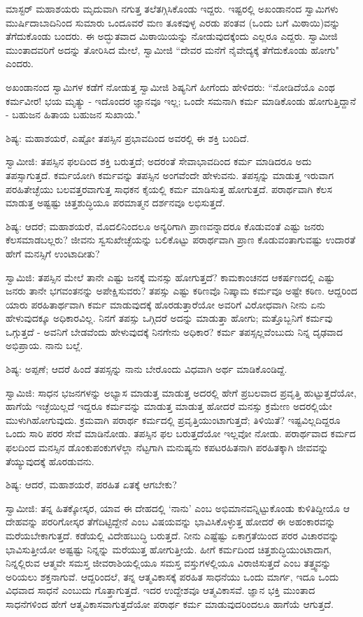 ಮಾಸ್ಟರ್ ಮಹಾಶಯರು ಮೃದುವಾಗಿ ನಗುತ್ತ ತಲೆತಗ್ಗಿಸಿಕೊಂಡು ಇದ್ದರು. ಇಷ್ಟರಲ್ಲಿ ಅಖಂಡಾನಂದ ಸ್ವಾಮಿಗಳು ಮುರ್ಷಿದಾಬಾದಿನಿಂದ ಸುಮಾರು ಒಂದೂವರೆ ಮಣ ತೂಕವುಳ್ಳ ಎರಡು ಪಂತವ (ಒಂದು ಬಗೆ ಮಿಠಾಯಿ)ವನ್ನು ತೆಗೆದುಕೊಂಡು ಬಂದರು. ಈ ಅದ್ಭುತವಾದ ಮಿಠಾಯಿಯನ್ನು ನೋಡುವುದಕ್ಕೆಂದು ಎಲ್ಲರೂ ಎದ್ದರು. ಸ್ವಾಮೀಜಿ ಮುಂತಾದವರಿಗೆ ಅದನ್ನು ತೋರಿಸಿದ ಮೇಲೆ, ಸ್ವಾಮೀಜಿ “ದೇವರ ಮನೆಗೆ ನೈವೇದ್ಯಕ್ಕೆ ತೆಗೆದುಕೊಂಡು ಹೋಗು" ಎಂದರು.

ಅಖಂಡಾನಂದ ಸ್ವಾಮಿಗಳ ಕಡೆಗೆ ನೋಡುತ್ತ ಸ್ವಾಮೀಜಿ ಶಿಷ್ಯನಿಗೆ ಹೀಗೆಂದು ಹೇಳಿದರು: “ನೋಡಿದೆಯೊ ಎಂಥ ಕರ್ಮವೀರ! ಭಯ ಮೃತ್ಯು - ಇದೊಂದರ ಜ್ಞಾನವೂ ಇಲ್ಲ; ಒಂದೇ ಸಮನಾಗಿ ಕರ್ಮ ಮಾಡಿಕೊಂಡು ಹೋಗುತ್ತಿದ್ದಾನೆ - ಬಹುಜನ ಹಿತಾಯ ಬಹುಜನ ಸುಖಾಯ."

ಶಿಷ್ಯ: ಮಹಾಶಯರೆ, ಎಷ್ಟೋ ತಪಸ್ಸಿನ ಪ್ರಭಾವದಿಂದ ಅವರಲ್ಲಿ ಈ ಶಕ್ತಿ ಬಂದಿದೆ.

ಸ್ವಾಮೀಜಿ: ತಪಸ್ಸಿನ ಫಲದಿಂದ ಶಕ್ತಿ ಬರುತ್ತದೆ; ಅದರಂತೆ ಸೇವಾಭಾವದಿಂದ ಕರ್ಮ ಮಾಡಿದರೂ ಅದು ತಪಸ್ಸಾಗುತ್ತದೆ. ಕರ್ಮಯೋಗಿ ಕರ್ಮವನ್ನು ತಪಸ್ಸಿನ ಅಂಗವೆಂದೇ ಹೇಳುವನು. ತಪಸ್ಸನ್ನು ಮಾಡುತ್ತ ಇರುವಾಗ ಪರಹಿತೇಚ್ಛೆಯು ಬಲವತ್ತರವಾಗುತ್ತ ಸಾಧಕನ ಕೈಯಲ್ಲಿ ಕರ್ಮ ಮಾಡಿಸುತ್ತ ಹೋಗುತ್ತದೆ. ಪರಾರ್ಥವಾಗಿ ಕೆಲಸ ಮಾಡುತ್ತ ಅಷ್ಟಷ್ಟು ಚಿತ್ತಶುದ್ಧಿಯೂ ಪರಮಾತ್ಮನ ದರ್ಶನವೂ ಲಭಿಸುತ್ತದೆ.

ಶಿಷ್ಯ: ಆದರೆ; ಮಹಾಶಯರೆ, ಮೊದಲಿನಿಂದಲೂ ಅನ್ಯರಿಗಾಗಿ ಪ್ರಾಣವನ್ನಾದರೂ ಕೊಡುವಂತೆ ಎಷ್ಟು ಜನರು ಕೆಲಸಮಾಡಬಲ್ಲರು? ಜೀವನು ಸ್ವಸುಖೇಚ್ಛೆಯನ್ನು ಬಲಿಕೊಟ್ಟು ಪರಾರ್ಥವಾಗಿ ಪ್ರಾಣ ಕೊಡುವಂತಾಗುವಷ್ಟು ಉದಾರತೆ ಹೇಗೆ ಮನಸ್ಸಿಗೆ ಉಂಟಾದೀತು?

ಸ್ವಾಮಿಜಿ: ತಪಸ್ಸಿನ ಮೇಲೆ ತಾನೇ ಎಷ್ಟು ಜನಕ್ಕೆ ಮನಸ್ಸು ಹೋಗುತ್ತದೆ? ಕಾಮಕಾಂಚನದ ಆಕರ್ಷಣದಲ್ಲಿ ಎಷ್ಟು ಜನರು ತಾನೇ ಭಗವಂತನನ್ನು ಅಪೇಕ್ಷಿಸುವರು? ತಪಸ್ಸು ಎಷ್ಟು ಕಠಿಣವೊ ನಿಷ್ಕಾಮ ಕರ್ಮವೂ ಅಷ್ಟೇ ಕಠಿಣ. ಆದ್ದರಿಂದ ಯಾರು ಪರಹಿತಾರ್ಥವಾಗಿ ಕರ್ಮ ಮಾಡುವುದಕ್ಕೆ ಹೊರಡುತ್ತಾರೆಯೋ ಅವರಿಗೆ ವಿರೋಧವಾಗಿ ನೀನು ಏನು ಹೇಳುವುದಕ್ಕೂ ಅಧಿಕಾರವಿಲ್ಲ. ನಿನಗೆ ತಪಸ್ಸು ಒಗ್ಗಿದರೆ ಅದನ್ನು ಮಾಡುತ್ತಾ ಹೋಗು; ಮತ್ತೊಬ್ಬನಿಗೆ ಕರ್ಮವು ಒಗ್ಗುತ್ತದೆ - ಅವನಿಗೆ ಬೇಡವೆಂದು ಹೇಳುವುದಕ್ಕೆ ನಿನಗೇನು ಅಧಿಕಾರ? ಕರ್ಮ ತಪಸ್ಸಲ್ಲವೆಂಬುದು ನಿನ್ನ ದೃಢವಾದ ಅಭಿಪ್ರಾಯ. ನಾನು ಬಲ್ಲೆ.

ಶಿಷ್ಯ: ಅಪ್ಪಣೆ; ಆದರೆ ಹಿಂದೆ ತಪಸ್ಸನ್ನು ನಾನು ಬೇರೊಂದು ವಿಧವಾಗಿ ಅರ್ಥ ಮಾಡಿಕೊಂಡಿದ್ದೆ.

ಸ್ವಾಮಿಜಿ: ಸಾಧನ ಭಜನಗಳನ್ನು ಅಭ್ಯಾಸ ಮಾಡುತ್ತ ಮಾಡುತ್ತ ಅದರಲ್ಲಿ ಹೇಗೆ ಪ್ರಬಲವಾದ ಪ್ರವೃತ್ತಿ ಹುಟ್ಟುತ್ತದೆಯೋ, ಹಾಗೆಯೆ ಇಚ್ಛೆಯಿಲ್ಲದೆ ಇದ್ದರೂ ಕರ್ಮವನ್ನು ಮಾಡುತ್ತ ಮಾಡುತ್ತ ಹೋದರೆ ಮನಸ್ಸು ಕ್ರಮೇಣ ಅದರಲ್ಲಿಯೇ ಮುಳುಗಿಹೋಗುವುದು. ಕ್ರಮವಾಗಿ ಪರಾರ್ಥ ಕರ್ಮದಲ್ಲಿ ಪ್ರವೃತ್ತಿಯುಂಟಾಗುತ್ತದೆ; ತಿಳಿಯಿತೆ? ಇಷ್ಟವಿಲ್ಲದಿದ್ದರೂ ಒಂದು ಸಾರಿ ಪರರ ಸೇವೆ ಮಾಡಿನೋಡು. ತಪಸ್ಸಿನ ಫಲ ಬರುತ್ತದೆಯೋ ಇಲ್ಲವೋ ನೋಡು. ಪರಾರ್ಥವಾದ ಕರ್ಮದ ಫಲದಿಂದ ಮನಸ್ಸಿನ ಡೊಂಕುಪಂಕುಗಳೆಲ್ಲಾ ನೆಟ್ಟಗಾಗಿ ಮನುಷ್ಯನು ಕಪಟರಹಿತನಾಗಿ ಪರಹಿತಕ್ಕಾಗಿ ಜೀವವನ್ನು ತೆಯ್ಯುವುದಕ್ಕೆ ಹೊರಡುವನು.

ಶಿಷ್ಯ: ಆದರೆ, ಮಹಾಶಯರೆ, ಪರಹಿತ ಏತಕ್ಕೆ ಆಗಬೇಕು?

ಸ್ವಾಮೀಜಿ: ತನ್ನ ಹಿತಕ್ಕೋಸ್ಕರ, ಯಾವ ಈ ದೇಹದಲ್ಲಿ ‘ನಾನು’ ಎಂಬ ಅಭಿಮಾನವನ್ನಿಟ್ಟುಕೊಂಡು ಕುಳಿತಿದ್ದೀಯೊ ಆ ದೇಹವನ್ನು ಪರರಿಗೋಸ್ಕರ ತೆಗೆದಿಟ್ಟಿದ್ದೇನೆ ಎಂಬ ವಿಷಯವನ್ನು ಭಾವಿಸಿಕೊಳ್ಳುತ್ತ ಹೋದರೆ ಈ ಅಹಂಕಾರವನ್ನು ಮರೆಯಬೇಕಾಗುತ್ತದೆ. ಕಡೆಯಲ್ಲಿ ವಿದೇಹಬುದ್ಧಿ ಬರುತ್ತದೆ. ನೀನು ಎಷ್ಟೆಷ್ಟು ಏಕಾಗ್ರತೆಯಿಂದ ಪರರ ವಿಚಾರವನ್ನು ಭಾವಿಸುತ್ತೀಯೋ ಅಷ್ಟಷ್ಟು ನಿನ್ನನ್ನು ಮರೆಯುತ್ತ ಹೋಗುತ್ತೀಯೆ. ಹೀಗೆ ಕರ್ಮದಿಂದ ಚಿತ್ತಶುದ್ಧಿಯುಂಟಾದಾಗ, ನಿನ್ನಲ್ಲಿರುವ ಆತ್ಮವೇ ಸಮಸ್ತ ಜೀವರಾಶಿಯಲ್ಲಿಯೂ ಸಮಸ್ತ ವಸ್ತುಗಳಲ್ಲಿಯೂ ವಿರಾಜಿಸುತ್ತದೆ ಎಂಬ ತತ್ತ್ವವನ್ನು ಅರಿಯಲು ಶಕ್ತನಾಗುವೆ. ಆದ್ದರಿಂದಲೆ, ತನ್ನ ಆತ್ಮವಿಕಾಸಕ್ಕೆ ಪರಹಿತ ಸಾಧನೆಯು ಒಂದು ಮಾರ್ಗ, ಇದೂ ಒಂದು ವಿಧವಾದ ಸಾಧನೆ ಎಂಬುದು ಗೊತ್ತಾಗುತ್ತದೆ. ಇದರ ಉದ್ದೇಶವೂ ಆತ್ಮವಿಕಾಸವೆ. ಜ್ಞಾನ ಭಕ್ತಿ ಮುಂತಾದ ಸಾಧನೆಗಳಿಂದ ಹೇಗೆ ಆತ್ಮವಿಕಾಸವಾಗುತ್ತದೆಯೋ ಪರಾರ್ಥ ಕರ್ಮ ಮಾಡುವುದರಿಂದಲೂ ಹಾಗೆಯೆ ಆಗುತ್ತದೆ.

